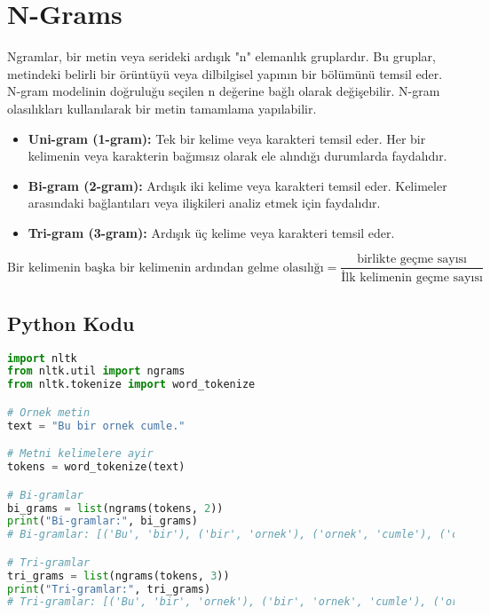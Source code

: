 \section{N-Grams}
Ngramlar, bir metin veya serideki ardışık "n" elemanlık gruplardır. Bu gruplar, metindeki belirli bir örüntüyü veya dilbilgisel yapının bir bölümünü temsil eder. N-gram modelinin doğruluğu seçilen n değerine bağlı olarak değişebilir. N-gram olasılıkları kullanılarak bir metin tamamlama yapılabilir. 
\begin{itemize}
    \item \textbf{Uni-gram (1-gram):} Tek bir kelime veya karakteri temsil eder. Her bir kelimenin veya karakterin bağımsız olarak ele alındığı durumlarda faydalıdır.
    \item \textbf{Bi-gram (2-gram):} Ardışık iki kelime veya karakteri temsil eder. Kelimeler arasındaki bağlantıları veya ilişkileri analiz etmek için faydalıdır.
    \item \textbf{Tri-gram (3-gram):} Ardışık üç kelime veya karakteri temsil eder.
\end{itemize}

\[\text{Bir kelimenin başka bir kelimenin ardından gelme olasılığı} = \frac{\text{birlikte geçme sayısı}}{\text{İlk kelimenin geçme sayısı}}\]

\subsection{Python Kodu}

\begin{lstlisting}[language=Python]
import nltk
from nltk.util import ngrams
from nltk.tokenize import word_tokenize

# Ornek metin
text = "Bu bir ornek cumle."

# Metni kelimelere ayir
tokens = word_tokenize(text)

# Bi-gramlar
bi_grams = list(ngrams(tokens, 2))
print("Bi-gramlar:", bi_grams)
# Bi-gramlar: [('Bu', 'bir'), ('bir', 'ornek'), ('ornek', 'cumle'), ('cumle', '.')]

# Tri-gramlar
tri_grams = list(ngrams(tokens, 3))
print("Tri-gramlar:", tri_grams)
# Tri-gramlar: [('Bu', 'bir', 'ornek'), ('bir', 'ornek', 'cumle'), ('ornek', 'cumle', '.')]
\end{lstlisting}

\newpage